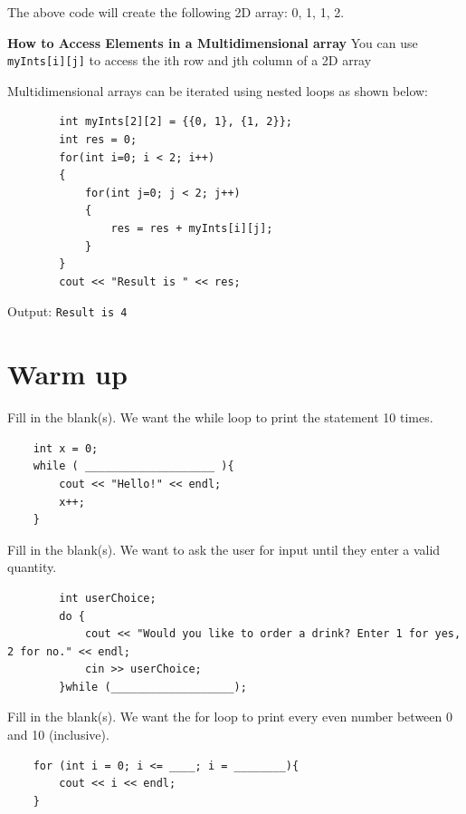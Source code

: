 The above code will create the following 2D array: {{0, 1}, {1, 2}}.

\textbf{How to Access Elements in a Multidimensional array}
You can use \texttt{myInts[i][j]} to access the ith row and jth column of a 2D array

Multidimensional arrays can be iterated using nested loops as shown below:

\begin{verbatim}
        int myInts[2][2] = {{0, 1}, {1, 2}};
        int res = 0;
        for(int i=0; i < 2; i++)
        {
            for(int j=0; j < 2; j++)
            {
                res = res + myInts[i][j];
            }
        }
        cout << "Result is " << res;
\end{verbatim}

Output: \texttt{Result is 4}

\section{Warm up}

\begin{problem}
Fill in the blank(s). We want the while loop to print the statement 10 times.
\begin{verbatim}
    int x = 0;
    while ( ____________________ ){
        cout << "Hello!" << endl;
        x++;
    }
\end{verbatim}

\end{problem}

\begin{problem}
    Fill in the blank(s). We want to ask the user for input until they enter a valid quantity. 
    \begin{verbatim}
        int userChoice;
        do {
            cout << "Would you like to order a drink? Enter 1 for yes, 2 for no." << endl;
            cin >> userChoice;
        }while (___________________);
    \end{verbatim}
\end{problem}

\begin{problem}
Fill in the blank(s). We want the for loop to print every even number between 0 and 10 (inclusive).
\begin{verbatim}
    for (int i = 0; i <= ____; i = ________){
        cout << i << endl;
    }
\end{verbatim}
\end{problem}

